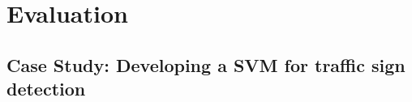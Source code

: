 \section{Evaluation}
\label{sec:evaluation}

\subsection{Case Study: Developing a SVM for traffic sign detection}
